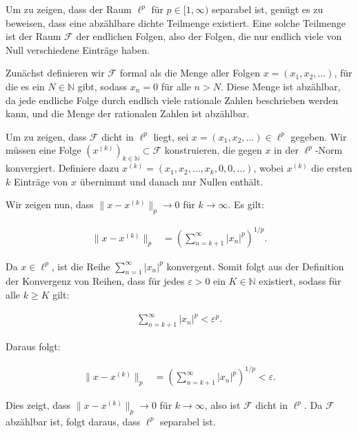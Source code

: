 Um zu zeigen, dass der Raum $\ell^p$ für $p \in [1, \infty)$ separabel ist, genügt es zu beweisen, dass eine abzählbare dichte Teilmenge existiert. Eine solche Teilmenge ist der Raum $\mathcal{F}$ der endlichen Folgen, also der Folgen, die nur endlich viele von Null verschiedene Einträge haben.

Zunächst definieren wir $\mathcal{F}$ formal als die Menge aller Folgen $x = (x_1, x_2, \ldots)$, für die es ein $N \in \mathbb{N}$ gibt, sodass $x_n = 0$ für alle $n > N$. Diese Menge ist abzählbar, da jede endliche Folge durch endlich viele rationale Zahlen beschrieben werden kann, und die Menge der rationalen Zahlen ist abzählbar.

Um zu zeigen, dass $\mathcal{F}$ dicht in $\ell^p$ liegt, sei $x = (x_1, x_2, \ldots) \in \ell^p$ gegeben. Wir müssen eine Folge $(x^{(k)})_{k \in \mathbb{N}} \subset \mathcal{F}$ konstruieren, die gegen $x$ in der $\ell^p$-Norm konvergiert. Definiere dazu $x^{(k)} = (x_1, x_2, \ldots, x_k, 0, 0, \ldots)$, wobei $x^{(k)}$ die ersten $k$ Einträge von $x$ übernimmt und danach nur Nullen enthält.

Wir zeigen nun, dass $\|x - x^{(k)}\|_p \to 0$ für $k \to \infty$. Es gilt:

\begin{align*}
\|x - x^{(k)}\|_p &= \left( \sum_{n=k+1}^{\infty} |x_n|^p \right)^{1/p}.
\end{align*}

Da $x \in \ell^p$, ist die Reihe $\sum_{n=1}^{\infty} |x_n|^p$ konvergent. Somit folgt aus der Definition der Konvergenz von Reihen, dass für jedes $\varepsilon > 0$ ein $K \in \mathbb{N}$ existiert, sodass für alle $k \geq K$ gilt:

\begin{align*}
\sum_{n=k+1}^{\infty} |x_n|^p < \varepsilon^p.
\end{align*}

Daraus folgt:

\begin{align*}
\|x - x^{(k)}\|_p &= \left( \sum_{n=k+1}^{\infty} |x_n|^p \right)^{1/p} < \varepsilon.
\end{align*}

Dies zeigt, dass $\|x - x^{(k)}\|_p \to 0$ für $k \to \infty$, also ist $\mathcal{F}$ dicht in $\ell^p$. Da $\mathcal{F}$ abzählbar ist, folgt daraus, dass $\ell^p$ separabel ist.

